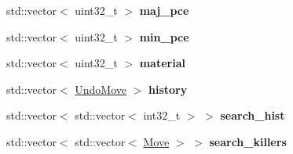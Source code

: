\begin{DoxyCompactItemize}
\item 
\mbox{\label{classBoard_a4ab7ed914850af43d50ddac56f65540b}} 
std\+::vector$<$ uint32\+\_\+t $>$ {\bfseries maj\+\_\+pce}
\item 
\mbox{\label{classBoard_a7b0851e3e6ee5768eb79c2c8b12115da}} 
std\+::vector$<$ uint32\+\_\+t $>$ {\bfseries min\+\_\+pce}
\item 
\mbox{\label{classBoard_a6f61a4de025f73967c32fa2508e57e61}} 
std\+::vector$<$ uint32\+\_\+t $>$ {\bfseries material}
\item 
\mbox{\label{classBoard_a5b52af2962ada66d52026a094fa5d295}} 
std\+::vector$<$ \mbox{\hyperlink{classUndoMove}{Undo\+Move}} $>$ {\bfseries history}
\item 
\mbox{\label{classBoard_a28585b33f128969c741a882f972e49f5}} 
std\+::vector$<$ std\+::vector$<$ int32\+\_\+t $>$ $>$ {\bfseries search\+\_\+hist}
\item 
\mbox{\label{classBoard_a18d1d7fd12618d3dfaa9d845577ad361}} 
std\+::vector$<$ std\+::vector$<$ \mbox{\hyperlink{classMove}{Move}} $>$ $>$ {\bfseries search\+\_\+killers}
\end{DoxyCompactItemize}
